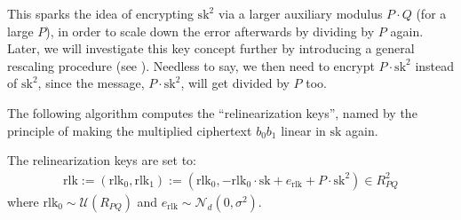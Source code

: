 \documentclass[letterpaper,10pt,english]{jupyterBook}
\begin{document}
\sphinxAtStartPar
This sparks the idea of encrypting \(\mathrm{sk}^2\) via a larger auxiliary modulus \(P\cdot Q\) (for a large \(P\)), in order to scale down the error afterwards by dividing by \(P\) again.
Later, we will investigate this key concept further by introducing a general rescaling procedure (see {\hyperref[\detokenize{Thesis:rescaling}]{}}).
Needless to say, we then need to encrypt \(P\cdot \mathrm{sk}^2\) instead of \(\mathrm{sk}^2\), since the message, \(P\cdot \mathrm{sk}^2\), will get divided by \(P\) too.

\sphinxAtStartPar
The following algorithm computes the “relinearization keys”, named by the principle of making the multiplied ciphertext \(b_0b_1\) linear in \(\mathrm{sk}\) again.

\sphinxAtStartPar
The relinearization keys are set to:
\begin{equation*}
\begin{split}\mathrm{rlk} := (\mathrm{rlk}_0, \mathrm{rlk}_1) := (\mathrm{rlk}_0, - \mathrm{rlk}_0 \cdot \mathrm{sk} + e_{\text{rlk}} + P\cdot\mathrm{sk}^2 ) \in R_{PQ}^2 \end{split}
\end{equation*}
\sphinxAtStartPar
where \(\mathrm{rlk}_0 \sim \mathcal U(R_{PQ})\) and \(e_{\text{rlk}} \sim \mathcal N_d(0, \sigma^2)\).
\end{document}

